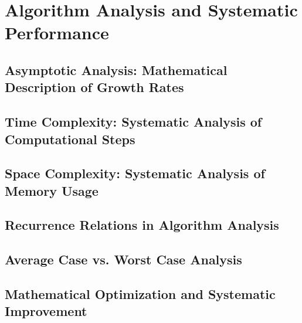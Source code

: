 

\chapter{Algorithm Analysis and Systematic Performance}

\section{Asymptotic Analysis: Mathematical Description of Growth Rates}

\section{Time Complexity: Systematic Analysis of Computational Steps}

\section{Space Complexity: Systematic Analysis of Memory Usage}

\section{Recurrence Relations in Algorithm Analysis}

\section{Average Case vs. Worst Case Analysis}

\section{Mathematical Optimization and Systematic Improvement}
